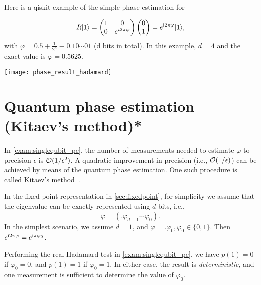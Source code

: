 \begin{exam}
\label{exam:qpe_hadamard}
Here is a qiskit example of the simple phase estimation for

\[
R|1\rangle = 
\begin{pmatrix}
1 & 0\\
0 & e^{i2\pi\varphi}\\ 
\end{pmatrix}
\begin{pmatrix}
0\\
1\\ 
\end{pmatrix}
= e^{\mathrm{i}2\pi\varphi}|1\rangle,
\]
with $\varphi=0.5+\frac{1}{2^d}\equiv 0.{10\cdots 01}$ (d bits in total). In this example, $d=4$ and the exact value is $\varphi=0.5625$. 
\begin{center}
\texttt{[image: phase\_result\_hadamard]}
\end{center}

\end{exam}

\section{Quantum phase estimation (Kitaev's method)*}

In \cref{exam:singlequbit_pe}, the number of measurements needed to estimate $\varphi$ to precision $\epsilon$ is $\mathcal{O}(1/\epsilon^2)$.
A quadratic improvement in precision (i.e., $\mathcal{O}(1/\epsilon)$) can be achieved by means of the quantum phase estimation. One such procedure is called Kitaev's method~\cite[Section 13.5]{KitaevShenVyalyi2002}.

In the fixed point representation in \cref{sec:fixedpoint}, for simplicity we assume that the eigenvalue can be exactly represented using $d$ bits, i.e.,
\begin{equation}
\varphi=(.\varphi_{d-1}\cdots\varphi_0).
\end{equation}
In the simplest scenario, we assume $d=1$, and $\varphi=.\varphi_0,\varphi_0\in\{0,1\}$.
Then $e^{\mathrm{i}2 \pi  \varphi}=e^{\mathrm{i} \pi \varphi_0}$.

Performing the real Hadamard test in \cref{exam:singlequbit_pe}, we have $p(1)=0$ if $\varphi_0=0$, and $p(1)=1$ if $\varphi_0=1$. 
In either case, the result is \emph{deterministic}, and one measurement is sufficient to determine the value of $\varphi_0$.

